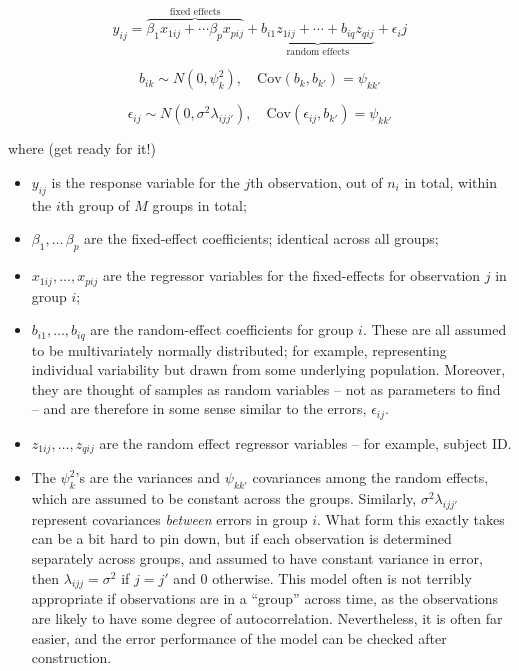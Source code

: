 \documentclass[]{book}
\providecommand{\tightlist}{%
  \setlength{\itemsep}{0pt}\setlength{\parskip}{0pt}}
\begin{document}
\[
y_{ij} = \overbrace{\beta_1 x_{1ij} + \cdots \beta_p x_{pij} }^\text{fixed effects} + \underbrace{b_{i1}z_{1ij} + \cdots + b_{iq} z_{qij}} _ \text{random effects} + \epsilon_ij
\]

\[
b_{ik} \sim N(0,\psi_{k}^{2}), \quad \text{Cov}(b_k,b_{k'}) = \psi_{kk'}
\]

\[
\epsilon_{ij} \sim N(0,\sigma^2 \lambda_{ijj'}),\quad \text{Cov}(\epsilon_{ij},b_{k'}) = \psi_{kk'}
\]

where (get ready for it!)

\begin{itemize}
\tightlist
\item
  \(y_{ij}\) is the response variable for the \(j\)th observation, out of \(n_i\) in total, within the \(i\)th group of \(M\) groups in total;
\item
  \(\beta_1,\ldots\,\beta_p\) are the fixed-effect coefficients; identical across all groups;
\item
  \(x_{1ij},\ldots,x_{pij}\) are the regressor variables for the fixed-effects for observation \(j\) in group \(i\);
\item
  \(b_{i1},\ldots,b_{iq}\) are the random-effect coefficients for group \(i\). These are all assumed to be multivariately normally distributed; for example, representing individual variability but drawn from some underlying population. Moreover, they are thought of samples as random variables -- not as parameters to find -- and are therefore in some sense similar to the errors, \(\epsilon_{ij}\).
\item
  \(z_{1ij},\ldots,z_{qij}\) are the random effect regressor variables -- for example, subject ID.
\item
  The \(\psi^{2}_{k}\)'s are the variances and \(\psi_{kk'}\) covariances among the random effects, which are assumed to be constant across the groups. Similarly, \(\sigma^2\lambda_{ijj'}\) represent covariances \emph{between} errors in group \(i\). What form this exactly takes can be a bit hard to pin down, but if each observation is determined separately across groups, and assumed to have constant variance in error, then \(\lambda_{ijj}=\sigma^2\) if \(j=j'\) and \(0\) otherwise. This model often is not terribly appropriate if observations are in a ``group'' across time, as the observations are likely to have some degree of autocorrelation. Nevertheless, it is often far easier, and the error performance of the model can be checked after construction.
\end{itemize}
\end{document}
